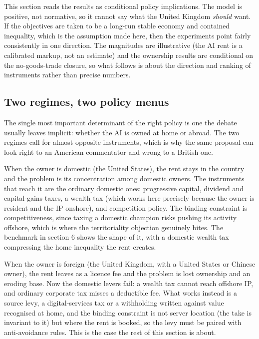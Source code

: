 \documentclass[11pt]{article}
\begin{document}
This section reads the results as conditional policy implications. The
model is positive, not normative, so it cannot say what the United
Kingdom \emph{should} want. If the objectives are taken to be a long-run
stable economy and contained inequality, which is the assumption made
here, then the experiments point fairly consistently in one direction.
The magnitudes are illustrative (the AI rent is a calibrated markup, not
an estimate) and the ownership results are conditional on the
no-goods-trade closure, so what follows is about the direction and
ranking of instruments rather than precise numbers.

\hypertarget{two-regimes-two-policy-menus}{%
\subsection{Two regimes, two policy
menus}\label{two-regimes-two-policy-menus}}

The single most important determinant of the right policy is one the
debate usually leaves implicit: whether the AI is owned at home or
abroad. The two regimes call for almost opposite instruments, which is
why the same proposal can look right to an American commentator and
wrong to a British one.

When the owner is domestic (the United States), the rent stays in the
country and the problem is its concentration among domestic owners. The
instruments that reach it are the ordinary domestic ones: progressive
capital, dividend and capital-gains taxes, a wealth tax (which works
here precisely because the owner is resident and the IP onshore), and
competition policy. The binding constraint is competitiveness, since
taxing a domestic champion risks pushing its activity offshore, which is
where the territoriality objection genuinely bites. The benchmark in
section 6 shows the shape of it, with a domestic wealth tax compressing
the home inequality the rent creates.

When the owner is foreign (the United Kingdom, with a United States or
Chinese owner), the rent leaves as a licence fee and the problem is lost
ownership and an eroding base. Now the domestic levers fail: a wealth
tax cannot reach offshore IP, and ordinary corporate tax misses a
deductible fee. What works instead is a source levy, a digital-services
tax or a withholding written against value recognised at home, and the
binding constraint is not server location (the take is invariant to it)
but where the rent is booked, so the levy must be paired with
anti-avoidance rules. This is the case the rest of this section is
about.
\end{document}
